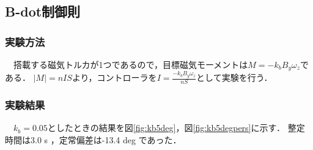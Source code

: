 \subsection{B-dot制御則}
\subsubsection{実験方法}
　搭載する磁気トルカが1つであるので，目標磁気モーメントは$M=-k_bB_y\omega_z$である．
$|M|=nIS$より，コントローラを$I=\frac{-k_bB_y\omega_z}{nS}$として実験を行う．

\subsubsection{実験結果}
　$k_b=0.05$としたときの結果を図\ref{fig:kb5deg}，図\ref{fig:kb5degpers}に示す．
整定時間は3.0 s ，定常偏差は-13.4 deg であった．

